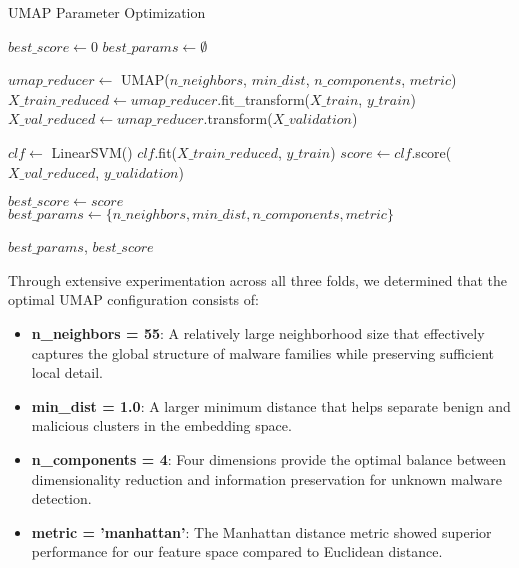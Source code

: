 \begin{algorithm}[!htbp]
\caption{UMAP Parameter Optimization}
\label{alg:umap-optimization}
\begin{algorithmic}[1]
    \State $best\_score \leftarrow 0$
    \State $best\_params \leftarrow \emptyset$
    
                    \State $umap\_reducer \leftarrow$ UMAP($n\_neighbors$, $min\_dist$, $n\_components$, $metric$)
                    \State $X\_train\_reduced \leftarrow umap\_reducer$.fit\_transform($X\_train$, $y\_train$)
                    \State $X\_val\_reduced \leftarrow umap\_reducer$.transform($X\_validation$)
                    
                    \State $clf \leftarrow$ LinearSVM()
                    \State $clf$.fit($X\_train\_reduced$, $y\_train$)
                    \State $score \leftarrow clf$.score($X\_val\_reduced$, $y\_validation$)
                    
                        \State $best\_score \leftarrow score$
                        \State $best\_params \leftarrow \{n\_neighbors, min\_dist, n\_components, metric\}$
                    \EndIf
                \EndFor
            \EndFor
        \EndFor
    \EndFor
    
    \Return $best\_params$, $best\_score$
\EndProcedure
\end{algorithmic}
\end{algorithm}

Through extensive experimentation across all three folds, we determined that the optimal UMAP configuration consists of:

\begin{itemize}
    \item \textbf{n\_neighbors = 55}: A relatively large neighborhood size that effectively captures the global structure of malware families while preserving sufficient local detail.
    
    \item \textbf{min\_dist = 1.0}: A larger minimum distance that helps separate benign and malicious clusters in the embedding space.
    
    \item \textbf{n\_components = 4}: Four dimensions provide the optimal balance between dimensionality reduction and information preservation for unknown malware detection.
    
    \item \textbf{metric = 'manhattan'}: The Manhattan distance metric showed superior performance for our feature space compared to Euclidean distance.
\end{itemize}

